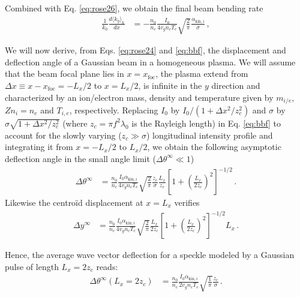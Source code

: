 \documentclass[%
 reprint,
 amsmath,amssymb,
 aps,
]{revtex4-1}
\begin{document}
Combined with Eq. \eqref{eq:rose26}, we obtain the final beam bending rate
  \begin{align}
\frac{1}{k_0} \frac{d \langle k_y\rangle_{k}    }{d x}& = - \frac{n_0 }{n_c}  \frac{  I_0 }{ 4 v_g n_c T_e } \sqrt{\frac{2}{\pi}}   \frac{\alpha_{\mathrm{kin},i} }{ \sigma}     
  \, ,\label{eq:bbf}
\end{align}

We will now derive, from Eqs. \eqref{eq:rose24} and \eqref{eq:bbf}, the displacement and deflection angle of a Gaussian beam in a homogeneous plasma.
We will assume that the beam focal plane lies in $x=x_\mathrm{foc}$, the plasma extend from $\Delta x \equiv x-x_\mathrm{foc}=-L_x/2$ to $x=L_x/2$, is infinite in the $y$ direction and characterized by an ion/electron mass, density and temperature given by $m_{i/e}$, $Zn_i=n_e$ and $T_{i,e}$, respectively.
Replacing $I_0$ by $ I_0/(1+\Delta x^2/z_c^2)$ and $\sigma$ by $ \sigma\sqrt{1+\Delta x^2/z_c^2}$  (where $z_c=\pi f^2\lambda_0$ is the Rayleigh length) in Eq. \eqref{eq:bbf}  to account for the slowly varying ($z_c\gg \sigma$) longitudinal intensity profile and integrating it from $x=-L_x/2$ to $L_x/2$, we obtain the following asymptotic deflection angle in the small angle limit ($\Delta \theta^{\infty} \ll 1$)
  \begin{align}
\Delta \theta^{\infty} & =\frac{n_0 }{n_c}  \frac{  I_0   \alpha_{\mathrm{kin},i}}{ 4 v_g n_c T_e } \sqrt{\frac{2}{\pi}}      \frac{z_c}{\sigma} \frac{L_x}{z_c} \left[ 1+\left(\frac{L_x}{2z_c}\right)^2\right]^{-1/2}
  \, .\label{eq:dth}
\end{align}
Likewise the centro\"id displacement at $x = L_x$ verifies
 \begin{align}
\Delta y^{\infty} & = \frac{n_0 }{n_c}  \frac{  I_0   \alpha_{\mathrm{kin},i}}{ 4 v_g n_c T_e } \sqrt{\frac{2}{\pi}}     \frac{L_x}{2z_c} \left[ 1+\left(\frac{L_x}{2z_c}\right)^2\right]^{-1/2} L_x
  \, .\label{eq:dy}
\end{align}

Hence, the average wave vector deflection for a speckle modeled by a Gaussian pulse of length $L_x=2z_c $ reads: 
 \begin{align}
\Delta \theta^{\infty}(L_x=2z_c) & = \frac{n_0 }{n_c}  \frac{  I_0   \alpha_{\mathrm{kin},i}}{ 2 v_g n_c T_e } \sqrt{\frac{1}{\pi}}      \frac{z_c}{\sigma}   
  \, .\label{eq:dthf}
\end{align}
\end{document}
